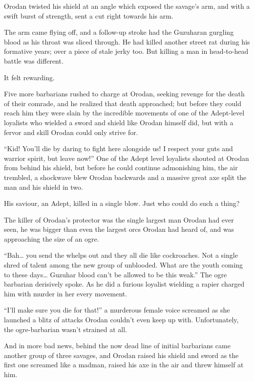 \documentclass[a4paper,10pt]{book}
\begin{document}
Orodan twisted his shield at an angle which exposed the savage’s arm, and with a swift burst of strength, sent a cut right towards his arm.\par
The arm came flying off, and a follow-up stroke had the Guzuharan gurgling blood as his throat was sliced through. He had killed another street rat during his formative years; over a piece of stale jerky too. But killing a man in head-to-head battle was different.\par
It felt rewarding.\par
Five more barbarians rushed to charge at Orodan, seeking revenge for the death of their comrade, and he realized that death approached; but before they could reach him they were slain by the incredible movements of one of the Adept-level loyalists who wielded a sword and shield like Orodan himself did, but with a fervor and skill Orodan could only strive for.\par
“Kid! You’ll die by daring to fight here alongside us! I respect your guts and warrior spirit, but leave now!” One of the Adept level loyalists shouted at Orodan from behind his shield, but before he could continue admonishing him, the air trembled, a shockwave blew Orodan backwards and a massive great axe split the man and his shield in two.\par
His saviour, an Adept, killed in a single blow. Just who could do such a thing?\par
The killer of Orodan’s protector was the single largest man Orodan had ever seen, he was bigger than even the largest orcs Orodan had heard of, and was approaching the size of an ogre.\par
“Bah… you send the whelps out and they all die like cockroaches. Not a single shred of talent among the new group of unblooded. What are the youth coming to these days… Guzuhar blood can’t be allowed to be this weak.” The ogre barbarian derisively spoke. As he did a furious loyalist wielding a rapier charged him with murder in her every movement.\par
“I’ll make sure you die for that!” a murderous female voice screamed as she launched a blitz of attacks Orodan couldn’t even keep up with. Unfortunately, the ogre-barbarian wasn’t strained at all.\par
And in more bad news, behind the now dead line of initial barbarians came another group of three savages, and Orodan raised his shield and sword as the first one screamed like a madman, raised his axe in the air and threw himself at him.\par
\end{document}
